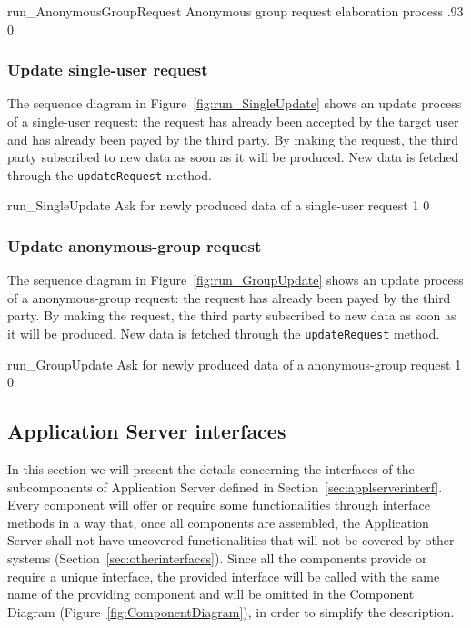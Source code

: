 \documentclass[../DD0.tex]{subfiles}
\begin{document}
      \fetchUML
        {run_AnonymousGroupRequest}
        {Anonymous group request elaboration process}
        {.93}           %
        {0}           %

    \clearpage

    \subsubsection{Update single-user request}
    \label{sec:updatesingledata}

      The sequence diagram in Figure~\ref{fig:run_SingleUpdate} shows an update process of a single-user request: the request has already been accepted by the target user and has already been payed by the third party. By making the request, the third party subscribed to new data as soon as it will be produced. New data is fetched through the \texttt{updateRequest} method.

      \fetchUML
        {run_SingleUpdate}
        {Ask for newly produced data of a single-user request}
        {1}           %
        {0}           %

    \clearpage

    \subsubsection{Update anonymous-group request}
    \label{sec:updatedata}

      The sequence diagram in Figure~\ref{fig:run_GroupUpdate} shows an update process of a anonymous-group request: the request has already been payed by the third party. By making the request, the third party subscribed to new data as soon as it will be produced. New data is fetched through the \texttt{updateRequest} method.

      \fetchUML
        {run_GroupUpdate}
        {Ask for newly produced data of a anonymous-group request}
        {1}           %
        {0}           %

  \clearpage

  \subsection{Application Server interfaces}
  \label{sec:compinterf}

    In this section we will present the details concerning the interfaces of the subcomponents of Application Server defined in Section~\ref{sec:applserverinterf}. Every component will offer or require some functionalities through interface methods in a way that, once all components are assembled, the Application Server shall not have uncovered functionalities that will not be covered by other systems (Section~\ref{sec:otherinterfaces}). Since all the components provide or require a unique interface, the provided interface will be called with the same name of the providing component and will be omitted in the Component Diagram (Figure~\ref{fig:ComponentDiagram}), in order to simplify the description.
\end{document}
